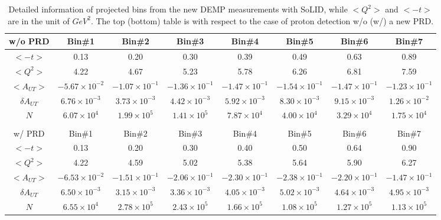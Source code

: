 	\begin{table}[!ht]
	\centering
	  \small
	\begin{tabular}{|c|c|c|c|c|c|c|c|}
	  \hline
	w/o PRD   &  Bin\#1 & Bin\#2 & Bin\#3 & Bin\#4 & Bin\#5 & Bin\#6 & Bin\#7 \\
	\hline 
	    $<-t>$                &  0.13 & 0.20   & 0.30   & 0.39   & 0.49   & 0.63   & 0.89  \\
	   $<Q^{2}>$          & 4.22  & 4.67   & 5.23   & 5.78   & 6.26   & 6.81  & 7.59  \\
	   $<A_{UT}>$        &$-5.67\times 10^{-2}$   & $-1.07\times 10^{-1}$   & $-1.36\times 10^{-1}$    & $-1.47\times 10^{-1}$    & $-1.54\times 10^{-1}$    & $-1.47\times 10^{-1}$   & $-1.23\times 10^{-1}$   \\
	   $\delta A_{UT}$  &  $6.76\times 10^{-3}$   & $3.73\times 10^{-3}$    &   $4.42\times 10^{-3}$  &  $5.92\times 10^{-3}$   &  $8.30\times 10^{-3}$   &   $9.15\times 10^{-3}$ &   $1.26\times 10^{-2}$ \\
	   $N$                     & $6.07\times 10^{4}$   &$1.99\times 10^{5}$   & $1.41\times 10^{5}$   &  $7.87\times 10^{4}$  & $4.00\times 10^{4}$  &  $3.29\times 10^{4}$ &$1.75\times 10^{4}$  \\
	 \hline
			\multicolumn{3}{c}{ } \\
   	\hline 
	w/ PRD   &  Bin\#1 & Bin\#2 & Bin\#3 & Bin\#4 & Bin\#5 & Bin\#6 & Bin\#7 \\
	 \hline
	  $<-t>$                &  0.13 & 0.20   & 0.30   & 0.40   & 0.50   & 0.64   & 0.90  \\
	   $<Q^{2}>$          & 4.22  & 4.59   & 5.02   & 5.38   & 5.64   & 5.90  & 6.27  \\
	   $<A_{UT}>$        &$-6.53\times 10^{-2}$   & $-1.51\times 10^{-1}$   & $-2.06\times 10^{-1}$    & $-2.30\times 10^{-1}$    & $-2.38\times 10^{-1}$    & $-2.20\times 10^{-1}$   & $-1.47\times 10^{-1}$   \\
	   $\delta A_{UT}$  &  $6.50\times 10^{-3}$   & $3.15\times 10^{-3}$    &   $3.36\times 10^{-3}$  &  $4.05\times 10^{-3}$   &  $5.02\times 10^{-3}$   &   $4.64\times 10^{-3}$ &   $4.95\times 10^{-3}$ \\
	   $N$                     & $6.55\times 10^{4}$   &$2.78\times 10^{5}$   & $2.43\times 10^{5}$   &  $1.66\times 10^{5}$  & $1.08\times 10^{5}$  &  $1.27\times 10^{5}$ &$1.13\times 10^{5}$  \\
	 \hline
	\end{tabular}
	\caption[Detailed information of projected bins]{\footnotesize{Detailed information of projected bins from the new DEMP measurements with SoLID, while $<Q^{2}>$ and $<-t>$ are in the unit of $GeV^{2}$. The top (bottom) table is with respect to the case of proton detection w/o (w/) a new PRD.}}
	\label{asym_bin_table}
\end{table} 

